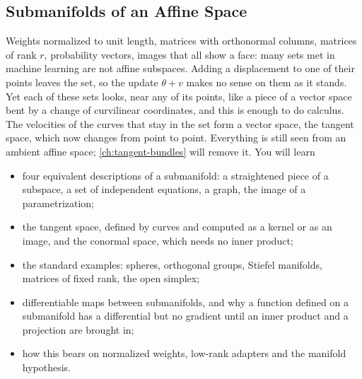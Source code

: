 \begin{notechapter}
\chapter{Submanifolds of an Affine Space}
\label{ch:submanifolds}

\begin{chapterintro}
Weights normalized to unit length, matrices with orthonormal columns,
matrices of rank $r$, probability vectors, images that all show a face:
many sets met in machine learning are not affine subspaces. Adding a
displacement to one of their points leaves the set, so the update
$\theta + v$ makes no sense on them as it stands. Yet each of these sets
looks, near any of its points, like a piece of a vector space bent by a
change of curvilinear coordinates, and this is enough to do calculus. The
velocities of the curves that stay in the set form a vector space, the
tangent space, which now changes from point to point. Everything is still
seen from an ambient affine space; \cref{ch:tangent-bundles} will remove
it. You will learn
\begin{itemize}[nosep]
  \item four equivalent descriptions of a submanifold: a straightened
        piece of a subspace, a set of independent equations, a graph, the
        image of a parametrization;
  \item the tangent space, defined by curves and computed as a kernel or
        as an image, and the conormal space, which needs no inner product;
  \item the standard examples: spheres, orthogonal groups, Stiefel
        manifolds, matrices of fixed rank, the open simplex;
  \item differentiable maps between submanifolds, and why a function
        defined on a submanifold has a differential but no gradient until
        an inner product and a projection are brought in;
  \item how this bears on normalized weights, low-rank adapters and the
        manifold hypothesis.
\end{itemize}
\end{chapterintro}


\end{notechapter}
